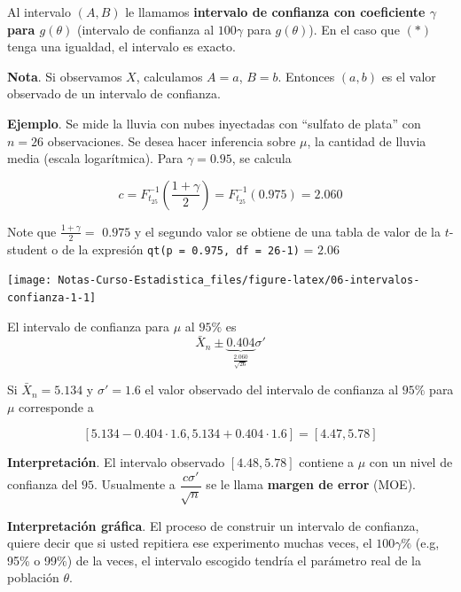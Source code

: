 \documentclass[
  12pt,
]{book}
\begin{document}
Al intervalo \((A,B)\) le llamamos \textbf{intervalo de confianza con coeficiente
\(\gamma\) para \(g(\theta)\)} (intervalo de confianza al \(100\gamma\) para \(g(\theta)\)). En
el caso que \((*)\) tenga una igualdad, el intervalo es exacto.

\textbf{Nota}. Si observamos \(X\), calculamos \(A=a\), \(B=b\). Entonces \((a,b)\) es el
valor observado de un intervalo de confianza.

\textbf{Ejemplo}. Se mide la lluvia con nubes inyectadas con ``sulfato de plata'' con
\(n=26\) observaciones. Se desea hacer inferencia sobre \(\mu\), la cantidad de
lluvia media (escala logarítmica). Para \(\gamma = 0.95\), se calcula

\[
c=F^{-1}_{t_{25}}\left(\dfrac{1+\gamma}2\right) =F^{-1}_{t_{25}}(0.975) = 2.060
\]

Note que \(\frac{1+\gamma}{2}=\) \(0.975\) y el segundo valor se obtiene de
una tabla de valor de la \(t\)-student o de la expresión \texttt{qt(p\ =\ 0.975,\ df\ =\ 26-1)} = \(2.06\)

\begin{center}\texttt{[image: Notas-Curso-Estadistica\_files/figure-latex/06-intervalos-confianza-1-1]} \end{center}

El intervalo de confianza para \(\mu\) al \(95\%\) es \[\bar X_n \pm
\underbrace{0.404}_{\frac{2.060}{\sqrt{26}}}\sigma'\]

Si \(\bar X_n = 5.134\) y \(\sigma' = 1.6\) el valor observado del intervalo de confianza
al \(95\%\) para \(\mu\) corresponde a

\[[5.134-0.404\cdot1.6, 5.134+0.404\cdot1.6]= [4.47,5.78]\]

\textbf{Interpretación}. El intervalo observado \([4.48,5.78]\) contiene a \(\mu\) con un
nivel de confianza del \(95%
\). Usualmente a \(\dfrac{c\sigma'}{\sqrt{n}}\) se le llama
\textbf{margen de error} (MOE).

\textbf{Interpretación gráfica}. El proceso de construir un intervalo de confianza,
quiere decir que si usted repitiera ese experimento muchas veces, el
\(100\gamma\%\) (e.g, 95\% o 99\%) de la veces, el intervalo escogido tendría el
parámetro real de la población \(\theta\).
\end{document}
